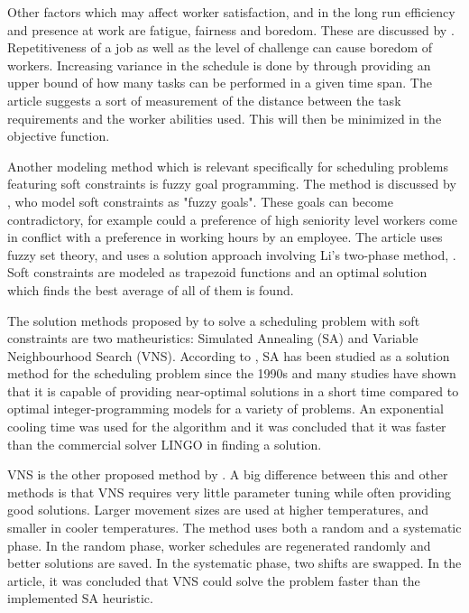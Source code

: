 Other factors which may affect worker satisfaction, and in the long run efficiency and presence at work are fatigue, fairness and boredom. These are discussed by  \citet{eiselt_2008}. Repetitiveness of a job as well as the level of challenge can cause boredom of workers. Increasing variance in the schedule is done by \citet{eiselt_2008} through providing an upper bound of how many tasks can be performed in a given time span. The article suggests a sort of measurement of the distance between the task requirements and the worker abilities used. This will then be minimized in the objective function.

Another modeling method which is relevant specifically for scheduling problems featuring soft constraints is fuzzy goal programming. The method is discussed by \citet{shahnazari_2013}, who model soft constraints as "fuzzy goals". These goals can become contradictory, for example could a preference of high seniority level workers come in conflict with a preference in working hours by an employee. The article uses fuzzy set theory, and uses a solution approach involving Li's two-phase method, \citet{lee_1990}. Soft constraints are modeled as trapezoid functions and an optimal solution which finds the best average of all of them is found.

The solution methods proposed by \citet{akbari_2013} to solve a scheduling problem with soft constraints are two matheuristics: Simulated Annealing (SA) and Variable Neighbourhood Search (VNS). According to \citet{akbari_2013}, SA has been studied as a solution method for the scheduling problem since the 1990s and many studies have shown that it is capable of providing near-optimal solutions in a short time compared to optimal integer-programming models for a variety of problems. An exponential cooling time was used for the algorithm and it was concluded that it was faster than the commercial solver LINGO in finding a solution.

VNS is the other proposed method by \citet{akbari_2013}. A big difference between this and other methods is that VNS requires very little parameter tuning while often providing good solutions.
Larger movement sizes are used at higher temperatures, and smaller in cooler temperatures. The method uses both a random and a systematic phase. In the random phase, worker schedules are regenerated randomly and better solutions are saved. In the systematic phase, two shifts are swapped. In the article, it was concluded that VNS could solve the problem faster than the implemented SA heuristic.

